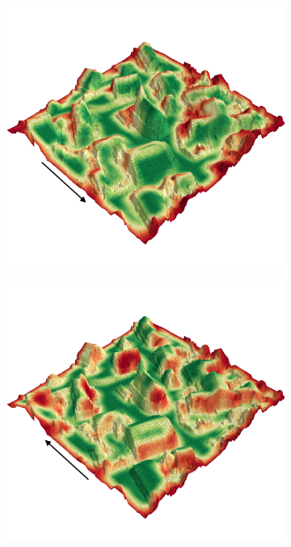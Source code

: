 \documentclass[../document.tex]{subfiles}
\begin{document}
\begin{figure}[H]
\begin{subfigure}[b]{0.45\textwidth}
  \end{subfigure}
  \begin{subfigure}[b]{0.45\textwidth}
    \includegraphics[width=\linewidth]{../img/4/traversability/sullens/-0.png}
  \end{subfigure}
  \begin{subfigure}[b]{0.45\textwidth}
      \includegraphics[width=\linewidth]{../img/4/traversability/sullens/-180.png}  

\end{subfigure}
\end{figure}
\end{document}
